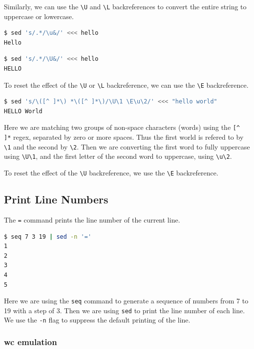Similarly, we can use the \lstinline|\U| and \lstinline|\L| backreferences to convert the entire string
to uppercase or lowercase.

\begin{lstlisting}[language=bash]
$ sed 's/.*/\u&/' <<< hello
Hello
\end{lstlisting}

\begin{lstlisting}[language=bash]
$ sed 's/.*/\U&/' <<< hello
HELLO
\end{lstlisting}

To reset the effect of the \lstinline|\U| or \lstinline|\L| backreference, we can use the \lstinline|\E| backreference.

\begin{lstlisting}[language=bash]
$ sed 's/\([^ ]*\) *\([^ ]*\)/\U\1 \E\u\2/' <<< "hello world"
HELLO World
\end{lstlisting}

Here we are matching two groups of non-space characters (words)
using the \lstinline|[^ ]*| regex,
separated by zero or more spaces.
Thus the first world is refered to by \lstinline|\1| and the second by \lstinline|\2|.
Then we are converting the first word to fully uppercase
using \lstinline|\U\1|,
and the first letter of the second word to uppercase,
using \lstinline|\u\2|.

To reset the effect of the \lstinline|\U| backreference, we use the \lstinline|\E| backreference.


\subsection{Print Line Numbers}

The \lstinline|=| command prints the line number of the current line.

\begin{lstlisting}[language=bash]
$ seq 7 3 19 | sed -n '='
1
2
3
4
5
\end{lstlisting}

Here we are using the \lstinline|seq| command to generate a sequence of numbers from 7 to 19 with a step of 3.
Then we are using \lstinline|sed| to print the line number of each line.
We use the \lstinline|-n| flag to suppress the default printing of the line.

\subsubsection{wc emulation}

